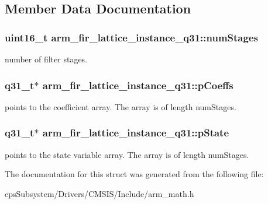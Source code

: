 \subsection{Member Data Documentation}
\hypertarget{structarm__fir__lattice__instance__q31_a9f3773bbb76bc5a8a5ee9d37786bf478}{
\subsubsection[{num\-Stages}]{\setlength{\rightskip}{0pt plus 5cm}uint16\-\_\-t arm\-\_\-fir\-\_\-lattice\-\_\-instance\-\_\-q31\-::num\-Stages}}\label{structarm__fir__lattice__instance__q31_a9f3773bbb76bc5a8a5ee9d37786bf478}
number of filter stages. \hypertarget{structarm__fir__lattice__instance__q31_a66c3364bf5863cd45e05f1652c3dc522}{
\subsubsection[{p\-Coeffs}]{\setlength{\rightskip}{0pt plus 5cm}q31\-\_\-t$\ast$ arm\-\_\-fir\-\_\-lattice\-\_\-instance\-\_\-q31\-::p\-Coeffs}}\label{structarm__fir__lattice__instance__q31_a66c3364bf5863cd45e05f1652c3dc522}
points to the coefficient array. The array is of length num\-Stages. \hypertarget{structarm__fir__lattice__instance__q31_a08fe9494ab7cd336b791e9657adadcf6}{
\subsubsection[{p\-State}]{\setlength{\rightskip}{0pt plus 5cm}q31\-\_\-t$\ast$ arm\-\_\-fir\-\_\-lattice\-\_\-instance\-\_\-q31\-::p\-State}}\label{structarm__fir__lattice__instance__q31_a08fe9494ab7cd336b791e9657adadcf6}
points to the state variable array. The array is of length num\-Stages. 

The documentation for this struct was generated from the following file\-:\begin{DoxyCompactItemize}
\item 
eps\-Subsystem/\-Drivers/\-C\-M\-S\-I\-S/\-Include/arm\-\_\-math.\-h\end{DoxyCompactItemize}
